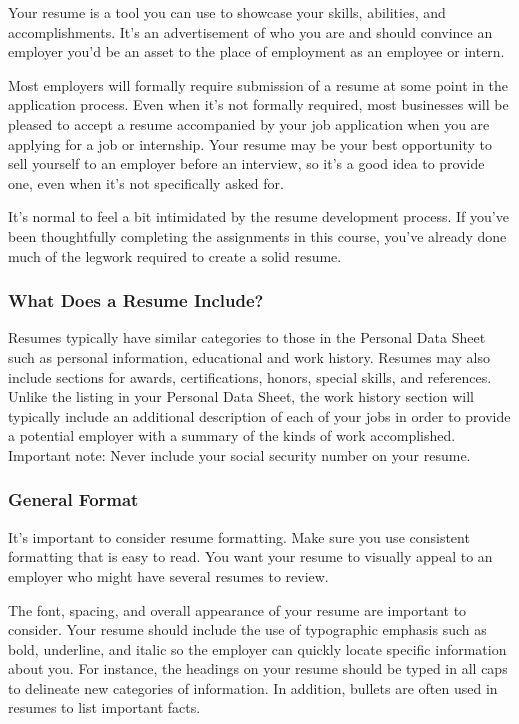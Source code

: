 Your resume is a tool you can use to showcase your skills, abilities, and accomplishments. It's an advertisement of who you are and should convince an employer you'd be an asset to the place of employment as an employee or intern.

Most employers will formally require submission of a resume at some point in the application process. Even when it's not formally required, most businesses will be pleased to accept a resume accompanied by your job application when you are applying for a job or internship. Your resume may be your best opportunity to sell yourself to an employer before an interview, so it's a good idea to provide one, even when it's not specifically asked for.

It's normal to feel a bit intimidated by the resume development process. If you've been thoughtfully completing the assignments in this course, you've already done much of the legwork required to create a solid resume.

\subsubsection*{What Does a Resume Include?}

Resumes typically have similar categories to those in the Personal Data Sheet such as personal information, educational and work history. Resumes may also include sections for awards, certifications, honors, special skills, and references. Unlike the listing in your Personal Data Sheet, the work history section will typically include an additional description of each of your jobs in order to provide a potential employer with a summary of the kinds of work accomplished. Important note: Never include your social security number on your resume.

\subsubsection*{General Format}

It's important to consider resume formatting. Make sure you use consistent formatting that is easy to read. You want your resume to visually appeal to an employer who might have several resumes to review.

The font, spacing, and overall appearance of your resume are important to consider. Your resume should include the use of typographic emphasis such as bold, underline, and italic so the employer can quickly locate specific information about you. For instance, the headings on your resume should be typed in all caps to delineate new categories of information. In addition, bullets are often used in resumes to list important facts.

